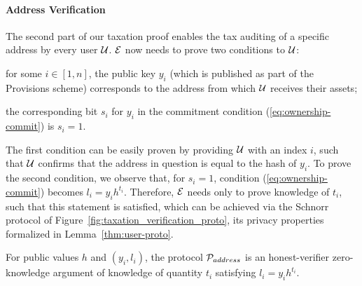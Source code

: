 \paragraph{Address Verification}\label{subsec:user-verification-proto}
The second part of our taxation proof enables the tax auditing of a specific
address by every user $\mathcal{U}$. $\mathcal{E}$ now needs to prove two conditions to
$\mathcal{U}$:
\begin{inparaenum}[i)]
    \item for some $i \in [1, n]$, the public key $y_i$ (which is published as
        part of the Provisions scheme) corresponds to the address from which
        $\mathcal{U}$ receives their assets;
    \item the corresponding bit $s_i$ for $y_i$ in the commitment condition
        (\ref{eq:ownership-commit}) is $s_i = 1$.
\end{inparaenum}
The first condition can be easily proven by providing $\mathcal{U}$ with an index
$i$, such that $\mathcal{U}$ confirms that the address in question is equal to the
hash of $y_i$. To prove the second condition, we observe that, for $s_i = 1$,
condition (\ref{eq:ownership-commit}) becomes
$l_i = y_ih^{t_i}$.
Therefore, $\mathcal{E}$ needs only to prove knowledge of $t_i$, such that this
statement is satisfied, which can be achieved via the Schnorr protocol
of Figure~\ref{fig:taxation_verification_proto}, its privacy properties formalized in
Lemma~\ref{thm:user-proto}.


\begin{lemma}\label{thm:user-proto}
    For public values $h$ and $(y_i, l_i)$, the protocol
    $\mathcal{P}_{address}$ is an honest-verifier zero-knowledge argument of
    knowledge of quantity $t_i$ satisfying $l_i = y_ih^{t_i}$.
\end{lemma}

